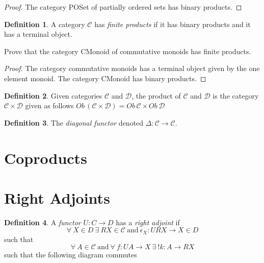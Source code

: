 \documentclass{article}
\theoremstyle{definition}
\newtheorem{definition}{Definition}[section]
\newcommand{\C}{\mathcal{C}}
\newcommand{\D}{\mathcal{D}}
\begin{document}
\begin{proof}
    The category POSet of partially ordered sets has binary products.
\end{proof}

\begin{definition}
    A category $\C$ has \textit{finite products} if
    it has binary products
    and it has a terminal object.
\end{definition}

Prove that the category CMonoid of commutative monoids has finite products.
\begin{proof}
    The category commutative monoids has a terminal object given by the one element monoid.
    The category CMonoid has binary products.
\end{proof}

\begin{definition}
    Given categories $\C$ and $\D$,
    the product of $\C$ and $\D$ is the category $\C \times \D$
    given as follows $Ob\,(\C \times \D) = Ob\,\C \times Ob\,\D$
\end{definition}

\begin{definition}
    The \textit{diagonal functor} denoted $\Delta : \C \rightarrow \C$.
\end{definition}


\pagebreak
\section{Coproducts}

\pagebreak
\section{Right Adjoints}
\begin{definition}
    A \textit{functor} $U : C \rightarrow D$ has a \textit{right adjoint} if
        $$
        \forall\ X \in D
        \ \exists
        \ RX \in \mathcal{C}\ \textrm{and}\ \epsilon_X : URX \rightarrow X \in D
        $$
        such that
        $$
        \forall\ A \in \mathcal{C}\ \textrm{and}\ \forall\ f : UA \rightarrow X
        \ \exists
        \ !k : A \rightarrow RX
        $$
        such that the following diagram commutes
    \begin{center}
    \end{center}
\end{definition}
\end{document}

